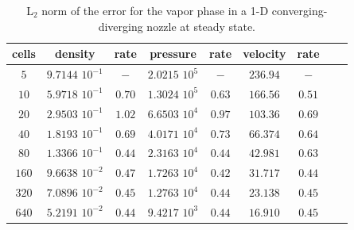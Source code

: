 \documentclass[review,10pt]{elsarticle}
\newcommand{\tcr}[1]{\textcolor{red}{#1}}
\begin{document}

\begin{table}[H]
\begin{center}
 \caption{\label{tbl:l2_norm_vap} L$_2$ norm of the error for the vapor phase in a 1-D converging-diverging nozzle at steady state.}
 \begin{tabular}{|c|c|c|c|c|c|c|c|c|}
 \hline
cells & density             & rate      & pressure          & rate      & velocity & rate       \\ \hline
$5$   & $9.7144$ $10^{-1}$  & $-$       & $2.0215$ $10^{5}$ & $-$       & $236.94$ & $-$        \\ \hline
$10$  & $5.9718$ $10^{-1}$  & $0.70$ & $1.3024$ $10^{5}$ & $0.63$ & $166.56$ & $0.51$  \\ \hline
$20$  & $2.9503$ $10^{-1}$  & $1.02$  & $6.6503$ $10^{4}$ & $0.97$ & $103.36$ & $0.69$  \\ \hline
$40$  & $1.8193$ $10^{-1}$  & $0.69$ & $4.0171$ $10^{4}$ & $0.73$ & $66.374$ & $0.64$   \\ \hline
$80$  & $1.3366$ $10^{-1}$  & $0.44$ & $2.3163$ $10^{4}$ & $0.44$ & $42.981$ & $0.63$  \\ \hline
$160$ & $9.6638$ $10^{-2}$  & $0.47$ & $1.7263$ $10^{4}$ & $0.42$ & $31.717$ & $0.44$  \\ \hline
$320$ & $7.0896$ $10^{-2}$  & $0.45$ & $1.2763$ $10^{4}$ & $0.44$ & $23.138$ & $0.45$  \\ \hline
$640$ & $5.2191$ $10^{-2}$  & $0.44$ & $9.4217$ $10^{3}$ & $0.44$ & $16.910$ & $0.45$  \\ \hline
\end{tabular}
\end{center}
\nonumber
\end{table}
\end{document}
